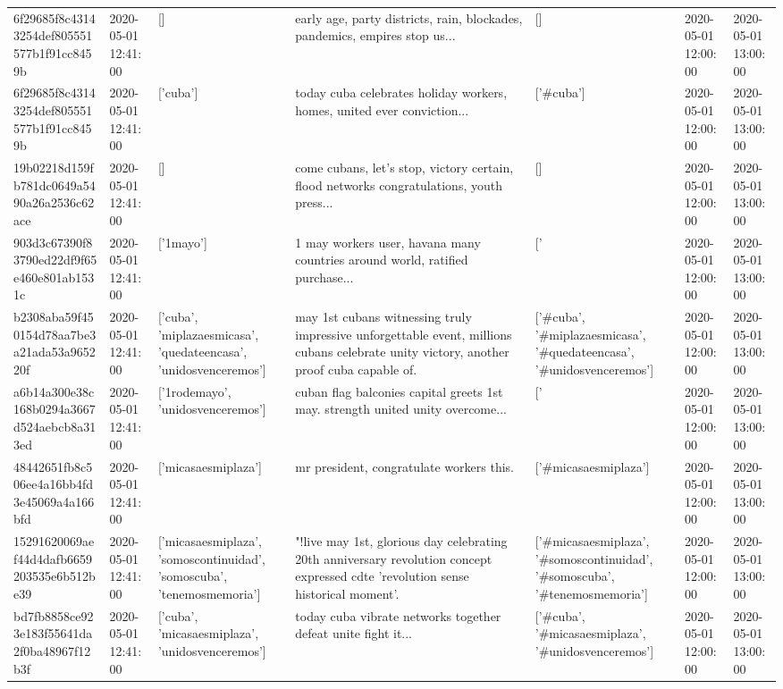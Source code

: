 \begin{tabular}{lllllll}
6f29685f8c43143254def805551577b1f91cc8459b & 2020-05-01 12:41:00 & [] & early age, party districts, rain, blockades, pandemics, empires stop us... & [] & 2020-05-01 12:00:00 & 2020-05-01 13:00:00 \\
6f29685f8c43143254def805551577b1f91cc8459b & 2020-05-01 12:41:00 & ['cuba'] & today cuba celebrates holiday workers, homes, united ever conviction... & ['#cuba'] & 2020-05-01 12:00:00 & 2020-05-01 13:00:00 \\
19b02218d159fb781dc0649a5490a26a2536c62ace & 2020-05-01 12:41:00 & [] & come cubans, let's stop, victory certain, flood networks congratulations, youth press... & [] & 2020-05-01 12:00:00 & 2020-05-01 13:00:00 \\
903d3c67390f83790ed22df9f65e460e801ab1531c & 2020-05-01 12:41:00 & ['1mayo'] & 1 may workers user, havana many countries around world, ratified purchase... & ['#1mayo'] & 2020-05-01 12:00:00 & 2020-05-01 13:00:00 \\
b2308aba59f450154d78aa7be3a21ada53a965220f & 2020-05-01 12:41:00 & ['cuba', 'miplazaesmicasa', 'quedateencasa', 'unidosvenceremos'] & may 1st cubans witnessing truly impressive unforgettable event, millions cubans celebrate unity victory, another proof cuba capable of. & ['#cuba', '#miplazaesmicasa', '#quedateencasa', '#unidosvenceremos'] & 2020-05-01 12:00:00 & 2020-05-01 13:00:00 \\
a6b14a300e38c168b0294a3667d524aebcb8a313ed & 2020-05-01 12:41:00 & ['1rodemayo', 'unidosvenceremos'] & cuban flag balconies capital greets 1st may. strength united unity overcome... & ['#1rodemayo', '#unidosvenceremos'] & 2020-05-01 12:00:00 & 2020-05-01 13:00:00 \\
48442651fb8c506ee4a16bb4fd3e45069a4a166bfd & 2020-05-01 12:41:00 & ['micasaesmiplaza'] & mr president, congratulate workers this. & ['#micasaesmiplaza'] & 2020-05-01 12:00:00 & 2020-05-01 13:00:00 \\
15291620069aef44d4dafb6659203535e6b512be39 & 2020-05-01 12:41:00 & ['micasaesmiplaza', 'somoscontinuidad', 'somoscuba', 'tenemosmemoria'] & "!live may 1st, glorious day celebrating 20th anniversary revolution concept expressed cdte 'revolution sense historical moment'. & ['#micasaesmiplaza', '#somoscontinuidad', '#somoscuba', '#tenemosmemoria'] & 2020-05-01 12:00:00 & 2020-05-01 13:00:00 \\
bd7fb8858ce923e183f55641da2f0ba48967f12b3f & 2020-05-01 12:41:00 & ['cuba', 'micasaesmiplaza', 'unidosvenceremos'] & today cuba vibrate networks together defeat unite fight it... & ['#cuba', '#micasaesmiplaza', '#unidosvenceremos'] & 2020-05-01 12:00:00 & 2020-05-01 13:00:00 \\

\end{tabular}
